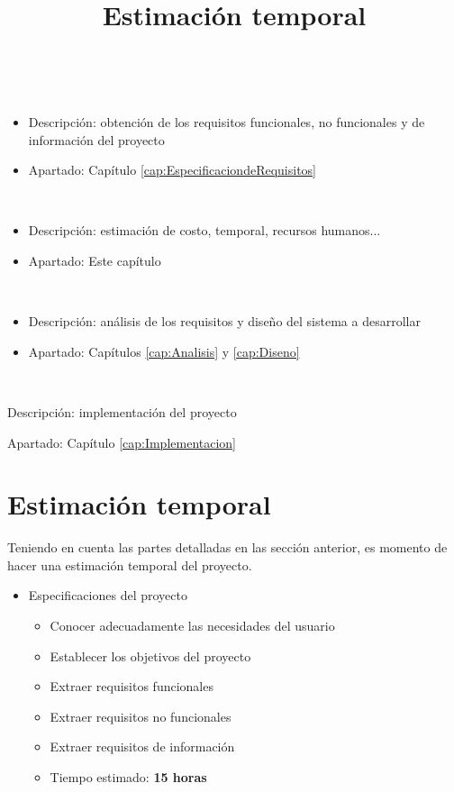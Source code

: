\begin{description}
  \item [Extracción de los requisitos]\hfill \\
  \begin{itemize}
    \item Descripción: obtención de los requisitos funcionales, no funcionales y de información del proyecto
    \item Apartado: Capítulo \ref{cap:EspecificaciondeRequisitos}
  \end{itemize}
  \item [Planificación]\hfill \\
    \begin{itemize}
      \item Descripción: estimación de costo, temporal, recursos humanos...
      \item Apartado: Este capítulo
    \end{itemize}
  \item [Ingeniería]\hfill \\
  \begin{itemize}
    \item Descripción: análisis de los requisitos y diseño del sistema a desarrollar
    \item Apartado: Capítulos \ref{cap:Analisis} y  \ref{cap:Diseno}
  \end{itemize}
  \item [Construcción]\hfill \\
  \item Descripción: implementación del proyecto
  \item Apartado: Capítulo \ref{cap:Implementacion}
\end{description}

\title{Estimación temporal}
\section{Estimación temporal}
Teniendo en cuenta las partes detalladas en las sección anterior, es momento de
hacer una estimación temporal del proyecto.


\begin{itemize}
  \item Especificaciones del proyecto
  \begin{itemize}
    \item{Conocer adecuadamente las necesidades del usuario}
    \item{Establecer los objetivos del proyecto}
    \item{Extraer requisitos funcionales}
    \item{Extraer requisitos no funcionales}
    \item{Extraer requisitos de información}
    \item{Tiempo estimado: \textbf{15 horas}}
  \end{itemize}
\end{itemize}

